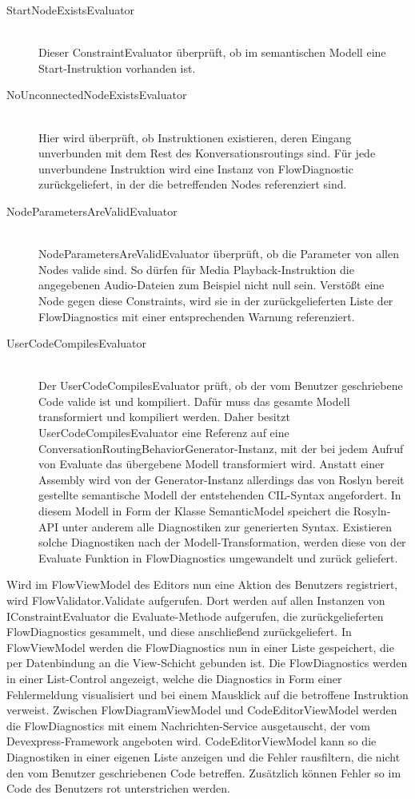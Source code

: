 \begin{description}
\item[StartNodeExistsEvaluator] \hfill \\
Dieser ConstraintEvaluator überprüft, ob im semantischen Modell eine Start-Instruktion vorhanden ist.
\item[NoUnconnectedNodeExistsEvaluator] \hfill \\
Hier wird überprüft, ob Instruktionen existieren, deren Eingang unverbunden mit dem Rest des Konversationsroutings sind. Für jede unverbundene Instruktion wird eine Instanz von FlowDiagnostic zurückgeliefert, in der die betreffenden Nodes referenziert sind.
\item[NodeParametersAreValidEvaluator] \hfill \\
NodeParametersAreValidEvaluator überprüft, ob die Parameter von allen Nodes valide sind. So dürfen für Media Playback-Instruktion die angegebenen Audio-Dateien zum Beispiel nicht null sein. Verstößt eine Node gegen diese Constraints, wird sie in der zurückgelieferten Liste der FlowDiagnostics mit einer entsprechenden Warnung referenziert.
\item[UserCodeCompilesEvaluator] \hfill \\
Der UserCodeCompilesEvaluator prüft, ob der vom Benutzer geschriebene Code valide ist und kompiliert. Dafür muss das gesamte Modell transformiert und kompiliert werden. Daher besitzt UserCodeCompilesEvaluator eine Referenz auf eine ConversationRoutingBehaviorGenerator-Instanz, mit der bei jedem Aufruf von Evaluate das übergebene Modell transformiert wird. Anstatt einer Assembly wird von der Generator-Instanz allerdings das von Roslyn bereit gestellte semantische Modell der entstehenden CIL-Syntax angefordert. In diesem Modell in Form der Klasse SemanticModel speichert die Rosyln-API unter anderem alle Diagnostiken zur generierten Syntax. Existieren solche Diagnostiken nach der Modell-Transformation, werden diese von der Evaluate Funktion in FlowDiagnostics umgewandelt und zurück geliefert.
\end{description}
Wird im FlowViewModel des Editors nun eine Aktion des Benutzers registriert, wird FlowValidator.Validate aufgerufen. Dort werden auf allen Instanzen von IConstraintEvaluator die Evaluate-Methode aufgerufen, die zurückgelieferten FlowDiagnostics gesammelt, und diese anschließend zurückgeliefert. In FlowViewModel werden die FlowDiagnostics nun in einer Liste gespeichert, die per Datenbindung an die View-Schicht gebunden ist. Die FlowDiagnostics werden in einer List-Control angezeigt, welche die Diagnostics in Form einer Fehlermeldung visualisiert und bei einem Mausklick auf die betroffene Instruktion verweist. Zwischen FlowDiagramViewModel und CodeEditorViewModel werden die FlowDiagnostics mit einem Nachrichten-Service ausgetauscht, der vom Devexpress-Framework angeboten wird. CodeEditorViewModel kann so die Diagnostiken in einer eigenen Liste anzeigen und die Fehler rausfiltern, die nicht den vom Benutzer geschriebenen Code betreffen. Zusätzlich können Fehler so im Code des Benutzers rot unterstrichen werden.

